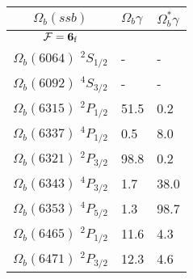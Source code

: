 \begin{tabular}{c |  p{0.65cm}  p{0.65cm}} \hline \hline
$\Omega_b(ssb)$  & $\Omega_{b} \gamma$  & $\Omega^{*}_{b} \gamma$  \\ \hline
$\mathcal{F}={\bf {6}}_{\rm f}$ &&\\ \hline
$\Omega_b(6064)$ $^{2}S_{1/2}$&-  &- \\
$\Omega_b(6092)$ $^{4}S_{3/2}$&-  &- \\
$\Omega_b(6315)$ $^{2}P_{1/2}$&51.5  &0.2 \\
$\Omega_b(6337)$ $^{4}P_{1/2}$&0.5  &8.0 \\
$\Omega_b(6321)$ $^{2}P_{3/2}$&98.8  &0.2 \\
$\Omega_b(6343)$ $^{4}P_{3/2}$&1.7  &38.0 \\
$\Omega_b(6353)$ $^{4}P_{5/2}$&1.3  &98.7 \\
$\Omega_b(6465)$ $^{2}P_{1/2}$&11.6  &4.3 \\
$\Omega_b(6471)$ $^{2}P_{3/2}$&12.3  &4.6 \\
\hline \hline
\end{tabular}
